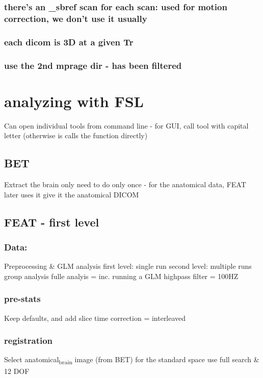 \documentclass[11pt]{article}
\begin{document}
\subsubsection{there's an \_sbref scan for each scan: used for motion correction, we don't use it usually}
\label{sec:org7aeff1b}
\subsubsection{each dicom is 3D at a given Tr}
\label{sec:org4f25fd2}
\subsubsection{use the 2nd mprage dir - has been filtered}
\label{sec:orgf2a01a7}
\section{analyzing with FSL}
\label{sec:org312cf0d}
Can open individual tools from command line - for GUI, call tool with capital letter (otherwise is calls the function directly)
\subsection{BET}
\label{sec:org8d8647a}
Extract the brain only
need to do only once - for the anatomical data, FEAT later uses it
give it the anatomical DICOM

\subsection{FEAT - first level}
\label{sec:orge4651f4}
\subsubsection{Data:}
\label{sec:orge280e07}
Preprocessing \& GLM analysis
first level: single run
second level: multiple runs
group analysis
fulle analyis = inc. running a GLM
highpass filter = 100HZ

\subsubsection{pre-stats}
\label{sec:org8f5a8a6}
Keep defaults, and add slice time correction = interleaved

\subsubsection{registration}
\label{sec:orgd9293ff}
Select anatomical\textsubscript{brain} image (from BET)
for the standard space use full search \& 12 DOF
\end{document}
